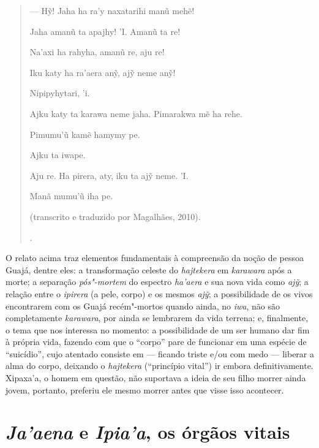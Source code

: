 \begin{quote}
{  --- Hỹ! Jaha ha ra'y naxatarihi manũ mehẽ!

  Jaha amanũ ta apajhy! 'I. Amanũ ta re!

  Na'axi ha rahyha, amanũ re, aju re!

  Iku katy ha ra'aera anỹ, ajỹ neme anỹ!

  Nipipyhytari, 'i.

  Ajku katy ta karawa neme jaha. Pimarakwa mẽ ha rehe.

  Pimumu'ũ kamẽ hamymy pe.

  Ajku ta iwape.

  Aju re. Ha pirera, aty, iku ta ajỹ neme. 'I.

  Manã mumu'ũ iha pe.

  (transcrito e traduzido por Magalhães, 2010).}.
\end{quote}

O relato acima traz elementos fundamentais à compreensão da noção de
pessoa Guajá, dentre eles: a transformação celeste do \emph{hajtekera}
em \emph{karawara} após a morte; a separação \emph{pós"-mortem} do
espectro \emph{ha'aera} e sua nova vida como \emph{ajỹ}; a relação entre
o \emph{ipirera} (a pele, corpo) e os mesmos \emph{ajỹ}; a possibilidade
de os vivos encontrarem com os Guajá recém"-mortos quando ainda, no
\emph{iwa}, não são completamente \emph{karawara}, por ainda se
lembrarem da vida terrena; e, finalmente, o tema que nos interessa no
momento: a possibilidade de um ser humano dar fim à própria vida,
fazendo com que o ``corpo'' pare de funcionar em uma espécie de
``suicídio'', cujo atentado consiste em --- ficando triste e/ou com medo ---
liberar a alma do corpo, deixando o \emph{hajtekera} (``princípio vital'')
ir embora definitivamente. Xipaxa'a, o homem em questão, não suportava a
ideia de seu filho morrer ainda jovem, portanto, preferiu ele mesmo
morrer antes que visse isso acontecer.

\section{\emph{Ja'aena} e \emph{Ipia'a}, os órgãos
vitais}\label{jaaena-e-ipiaa-os-uxf3rguxe3os-vitais}

